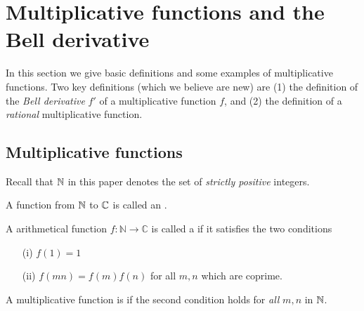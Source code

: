
\section{Multiplicative functions and the Bell derivative}

In this section we give basic definitions and some examples of multiplicative functions. Two key definitions (which we believe are new) are (1) the definition of the \emph{Bell derivative} $f'$ of a multiplicative function $f$, and (2) the definition of  a \emph{rational} multiplicative function.

\subsection{Multiplicative functions}

Recall that $\mathbb{N}$ in this paper denotes the set of \emph{strictly positive} integers.

\begin{definition}
A function from $\mathbb{N}$ to $\mathbb{C}$ is called an .
\end{definition}

\begin{definition} \label{def:multiplicative}
A arithmetical function $f: \mathbb{N} \to \mathbb{C}$ is called a  if it satisfies the two conditions
\begin{itemize}
\item[(i)] $f(1) = 1$
\item[(ii)] $f(mn) = f(m) f(n)$ for all $m, n$ which are coprime.
\end{itemize}
A multiplicative function is  if the second condition holds for \emph{all} $m, n$ in $\mathbb{N}$.

\end{definition}



